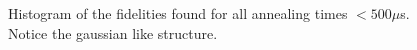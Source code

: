 \documentclass[12pt]{dalthesis}
\begin{document}
\begin{figure}
	\caption[Short Time Fidelity Histogram]{Histogram of the fidelities found for all annealing times  $< 500 \mu$s.  Notice the gaussian like structure.}
	\label{fig:fid_hist}
\end{figure}



\end{document}
